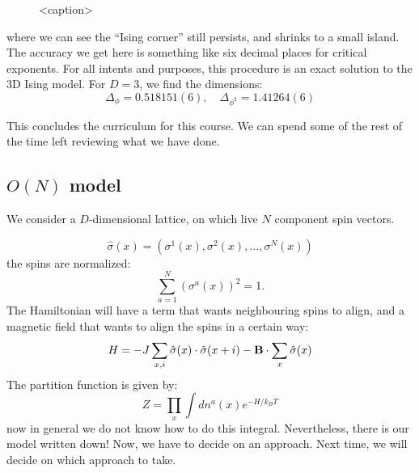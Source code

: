 \begin{figure}[htbp]
    \centering
    
    \caption{<caption>}
    \label{<label>}
\end{figure}

where we can see the ``Ising corner'' still persists, and shrinks to a small island. The accuracy we get here is something like six decimal places for critical exponents. For all intents and purposes, this procedure is an exact solution to the 3D Ising model. For $D = 3$, we find the dimensions:
\begin{equation}
    \Delta_\phi = 0.518151(6), \quad \Delta_{\phi^2} = 1.41264(6)
\end{equation}

This concludes the curriculum for this course. We can spend some of the rest of the time left reviewing what we have done.

\subsection{$O(N)$ model}
We consider a $D$-dimensional lattice, on which live $N$ component spin vectors.

\begin{equation}
    \hat{\sigma}(x) = (\sigma^1(x), \sigma^2(x), \ldots, \sigma^N(x))
\end{equation}
the spins are normalized:
\begin{equation}
    \sum_{a=1}^N (\sigma^a(x))^2 = 1.
\end{equation}
The Hamiltonian will have a term that wants neighbouring spins to align, and a magnetic field that wants to align the spins in a certain way:
\begin{equation}
    H = -J\sum_{x, i}\hat{\sigma}(x)\cdot \hat{\sigma}(x + i) - \mathbf{B} \cdot \sum_x \hat{\sigma}(x)
\end{equation}
The partition function is given by:
\begin{equation}
    Z = \prod_x \int dn^a(x) e^{-H/k_B T}
\end{equation}
now in general we do not know how to do this integral. Nevertheless, there is our model written down! Now, we have to decide on an approach. Next time, we will decide on which approach to take.